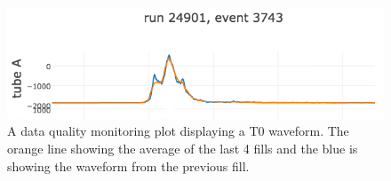 \begin{figure}[th]
\centering
\includegraphics[scale=0.7]{Figures/t0plot.png}
\decoRule
\caption{A data quality monitoring plot displaying a T0 waveform. The orange line showing the average of the last 4 fills and the blue is showing the waveform from the previous fill.}
\label{fig:t0plot}
\end{figure}

